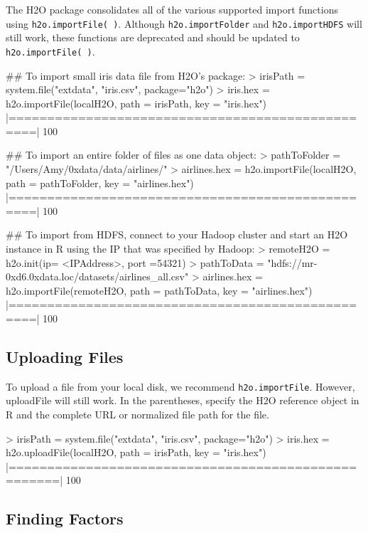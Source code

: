 \documentclass[11pt]{article}
\begin{document}
\begin{enumerate}
The H2O package consolidates all of the various supported import functions using {\texttt{h2o.importFile( )}}. Although {\texttt{h2o.importFolder}} and {\texttt{h2o.importHDFS}} will still work, these functions are deprecated and should be updated to {\texttt{h2o.importFile( )}}. 
\begin{spverbatim}

## To import small iris data file from H2O's package:
> irisPath = system.file("extdata", "iris.csv", package="h2o")
> iris.hex = h2o.importFile(localH2O, path = irisPath, key = "iris.hex")
      |=================================================| 100%

## To import an entire folder of files as one data object:
> pathToFolder = "/Users/Amy/0xdata/data/airlines/"
> airlines.hex = h2o.importFile(localH2O, path = pathToFolder, key = "airlines.hex")
      |=================================================| 100%

## To import from HDFS, connect to your Hadoop cluster and start an H2O instance in R using the IP that was specified by Hadoop:
> remoteH2O = h2o.init(ip= <IPAddress>, port =54321)
> pathToData = "hdfs://mr-0xd6.0xdata.loc/datasets/airlines_all.csv"
> airlines.hex = h2o.importFile(remoteH2O, path = pathToData, key = "airlines.hex")
      |=================================================| 100%
\end{spverbatim}


\subsection{Uploading Files}

To upload a file from your local disk, we recommend {\texttt{h2o.importFile}}. However, uploadFile will still work. In the parentheses, specify the H2O reference object in R and the complete URL or normalized file path for the file.
\begin{spverbatim}

> irisPath = system.file("extdata", "iris.csv", package="h2o")
> iris.hex = h2o.uploadFile(localH2O, path = irisPath, key = "iris.hex")
|====================================================| 100%
\end{spverbatim}


\subsection{Finding Factors}
\begin{spverbatim}


\end{spverbatim}
\end{enumerate}
\end{document}
